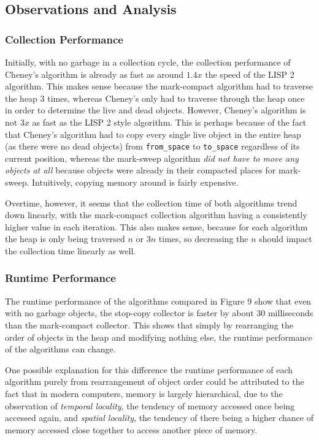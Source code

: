 \documentclass[index]{subfiles}
\begin{document}
\subsection{Observations and Analysis}

\subsubsection{Collection Performance}

Initially, with no garbage in a collection cycle, the collection performance of Cheney's algorithm is already as fast as around \(1.4x\) the speed of the LISP 2 algorithm. This makes sense because the mark-compact algorithm had to traverse the heap 3 times, whereas Cheney's only had to traverse through the heap once in order to determine the live and dead objects. However, Cheney's algorithm is not \(3x\) as fast as the LISP 2 style algorithm. This is perhaps because of the fact that Cheney's algorithm had to copy every single live object in the entire heap (as there were no dead objects) from \verb+from_space+ to \verb+to_space+ regardless of its current position, whereas the mark-sweep algorithm \textit{did not have to move any objects at all} because objects were already in their compacted places for mark-sweep. Intuitively, copying memory around is fairly expensive. 

Overtime, however, it seems that the collection time of both algorithms trend down linearly, with the mark-compact collection algorithm having a consistently higher value in each iteration. This also makes sense, because for each algorithm the heap is only being traversed \(n\) or \(3n\) times, so decreasing the \(n\) should impact the collection time linearly as well. 

\subsubsection{Runtime Performance}

The runtime performance of the algorithms compared in Figure 9 show that even with no garbage objects, the stop-copy collector is faster by about 30 milliseconds than the mark-compact collector. This shows that simply by rearranging the order of objects in the heap and modifying nothing else, the runtime performance of the algorithms can change. 

One possible explanation for this difference the runtime performance of each algorithm purely from rearrangement of object order could be attributed to the fact that in modern computers, memory is largely hierarchical\cite{simondevCanJavaScriptGo2021}, due to the observation of \textit{temporal locality}, the tendency of memory accessed once being accessed again, and \textit{spatial locality}, the tendency of there being a higher chance of memory accessed close together to access another piece of memory.
\end{document}
